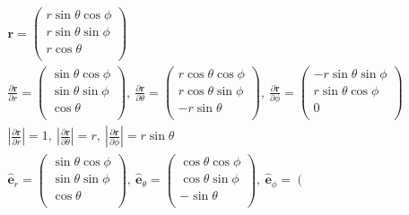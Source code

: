 \documentclass[12pt]{article}
\newenvironment{problem}[2][Problem]{\begin{trivlist}
\item[\hskip \labelsep {\bfseries #1}\hskip \labelsep {\bfseries #2.}]}{\end{trivlist}}
\begin{document}
\begin{problem}{2}
\end{problem}
\begin{gather*}
	\mathbf{r} = \left( \begin{array}{c}
			r\sin\theta\cos\phi \\
			r\sin\theta\sin\phi \\
			r\cos\theta \\
		\end{array} \right) \\
	\frac{\partial\mathbf{r}}{\partial r} = \left( \begin{array}{c}
			\sin\theta\cos\phi \\
			\sin\theta\sin\phi \\
			\cos\theta \\
		\end{array} \right),\ 
		\frac{\partial\mathbf{r}}{\partial \theta} = \left( \begin{array}{c}
			r\cos\theta\cos\phi \\
			r\cos\theta\sin\phi \\
			-r\sin\theta \\
		\end{array} \right),\ 
		\frac{\partial\mathbf{r}}{\partial \phi} = \left( \begin{array}{c}
			-r\sin\theta\sin\phi \\
			r\sin\theta\cos\phi \\
			0 \\
		\end{array} \right) \\
	\left| \frac{\partial\mathbf{r}}{\partial r} \right| = 1,\ 
		\left| \frac{\partial\mathbf{r}}{\partial \theta} \right| = r,\ 
		\left| \frac{\partial\mathbf{r}}{\partial \phi} \right| = r\sin\theta \\
	\hat{\mathbf{e}}_r = \left( \begin{array}{c}
			\sin\theta\cos\phi \\
			\sin\theta\sin\phi \\
		\cos\theta \\
		\end{array} \right),\ 
		\hat{\mathbf{e}}_\theta = \left( \begin{array}{c}
			\cos\theta\cos\phi \\
			\cos\theta\sin\phi \\
			-\sin\theta \\
		\end{array} \right),\ 
		\hat{\mathbf{e}}_\phi = \left( \begin{array}{c}

\end{array}
\end{gather*}
\end{document}
